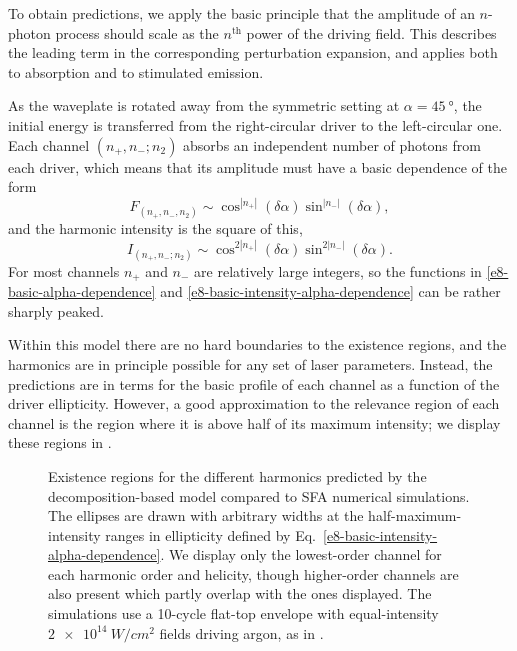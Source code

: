 To obtain predictions, we apply the basic principle that the amplitude of an $n$-photon process should scale as the $n^\text{th}$ power of the driving field. This describes the leading term in the corresponding perturbation expansion, and applies both to absorption and to stimulated emission.


As the waveplate is rotated away from the symmetric setting at $\alpha=\SI{45}{\degree}$, the initial energy is transferred from the right-circular driver to the left-circular one. Each channel $(n_+,n_-;n_2)$ absorbs an independent number of photons from each driver, which means that its amplitude must have a basic dependence of the form
\begin{equation}
 F_{(n_+,n_-,n_2)}\sim\cos^{|n_+|}(\delta\alpha)\sin^{|n_-|}(\delta\alpha),
 \label{e8-basic-alpha-dependence}
\end{equation}
and the harmonic intensity is the square of this,
\begin{equation}
 I_{(n_+,n_-;n_2)}\sim\cos^{2|n_+|}(\delta\alpha)\sin^{2|n_-|}(\delta\alpha).
 \label{e8-basic-intensity-alpha-dependence}
\end{equation}
For most channels $n_+$ and $n_-$ are relatively large integers, so the functions in \eqref{e8-basic-alpha-dependence} and \eqref{e8-basic-intensity-alpha-dependence} can be rather sharply peaked. 



Within this model there are no hard boundaries to the existence regions, and the harmonics are in principle possible for any set of laser parameters. Instead, the predictions are in terms for the basic profile of each channel as a function of the driver ellipticity. However, a good approximation to the relevance region of each channel is the region where it is above half of its maximum intensity; we display these regions in . 




\begin{figure}[h]
  \centering
  \hspace{0mm}
  
  \captionsetup{width=\textwidth}
  \caption[
  Existence regions for bicircular harmonics using the decomposition-based model, compared to SFA simulations
  ]{
  Existence regions for the different harmonics predicted by the decomposition-based model compared to SFA numerical simulations. The ellipses are drawn with arbitrary widths at the half-maximum-intensity ranges in ellipticity defined by Eq.~\eqref{e8-basic-intensity-alpha-dependence}. We display only the lowest-order channel for each harmonic order and helicity, though higher-order channels are also present which partly overlap with the ones displayed. 
  The simulations use a 10-cycle flat-top envelope with equal-intensity $\SI{2e14}{W/cm^2}$ fields driving argon, as in .
  }
  \label{f8-existence-region-ellipses}
\end{figure}




